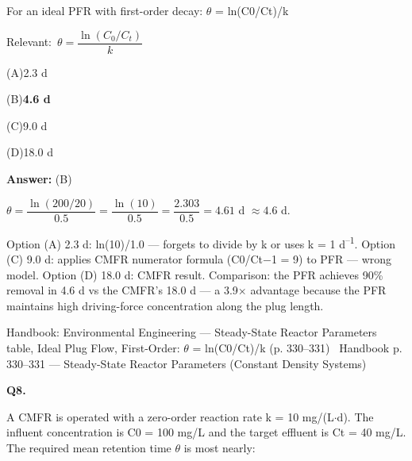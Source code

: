 \documentclass[11pt]{article}
\newcommand{\correct}[1]{\textbf{#1}\;{\color{accent}$\checkmark$}}
\newcommand{\optline}[2]{\par\noindent\hspace{1.2em}(#1)\hspace{0.6em}#2}
\begin{document}
For an ideal PFR with first-order decay: $\theta$ = ln(C0/Ct)/k\par\vspace{3pt}
{\small\color{soft}Relevant:}\ $\theta = \dfrac{\ln(C_0/C_t)}{k}$\par\vspace{3pt}
\optline{A}{2.3 d}
\optline{B}{\correct{4.6 d}}
\optline{C}{9.0 d}
\optline{D}{18.0 d}
\par\vspace{3pt}
\vspace{2pt}\par\noindent\colorbox{boxbg}{\parbox{\dimexpr\linewidth-2\fboxsep\relax}{%
\vspace{2pt}\textbf{Answer:} (B)\par\vspace{2pt}
{\small $\theta = \dfrac{\ln(200/20)}{0.5} = \dfrac{\ln(10)}{0.5} = \dfrac{2.303}{0.5} = 4.61$ d $\approx 4.6$ d.

Option (A) 2.3 d: ln(10)/1.0 --- forgets to divide by k or uses k = 1 d\textsuperscript{--}\textsuperscript{1}. Option (C) 9.0 d: applies CMFR numerator formula (C0/Ct$-$1 = 9) to PFR --- wrong model. Option (D) 18.0 d: CMFR result. Comparison: the PFR achieves 90\% removal in 4.6 d vs the CMFR's 18.0 d --- a 3.9$\times$ advantage because the PFR maintains high driving-force concentration along the plug length.}\par\vspace{2pt}
{\footnotesize\color{soft}Handbook: Environmental Engineering --- Steady-State Reactor Parameters table, Ideal Plug Flow, First-Order: $\theta$ = ln(C0/Ct)/k (p. 330--331) \textbullet\ Handbook p. 330--331 --- Steady-State Reactor Parameters (Constant Density Systems)}\vspace{2pt}
}}
\vspace{9pt}
\filbreak
\textbf{\color{accent}Q8.}\par\vspace{2pt}
A CMFR is operated with a zero-order reaction rate k = 10 mg/(L$\cdot$d). The influent concentration is C0 = 100 mg/L and the target effluent is Ct = 40 mg/L. The required mean retention time $\theta$ is most nearly:
\end{document}
